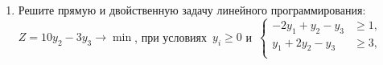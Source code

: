 \documentclass[a5paper,14pt]{extarticle}
\begin{document}
\begin{enumerate}
\item Решите прямую и двойственную задачу линейного программирования:
$Z = 10y_2-3y_3 \to \min$,  при условиях~$y_i \geqslant 0$ 
и~$
\left\lbrace\begin{aligned}
-2y_1 + y_2 -y_3 & \geqslant 1,\\
y_1 + 2y_2 -y_3 & \geqslant 3,\\
\end{aligned}\right.
$





\end{enumerate}
\end{document}
